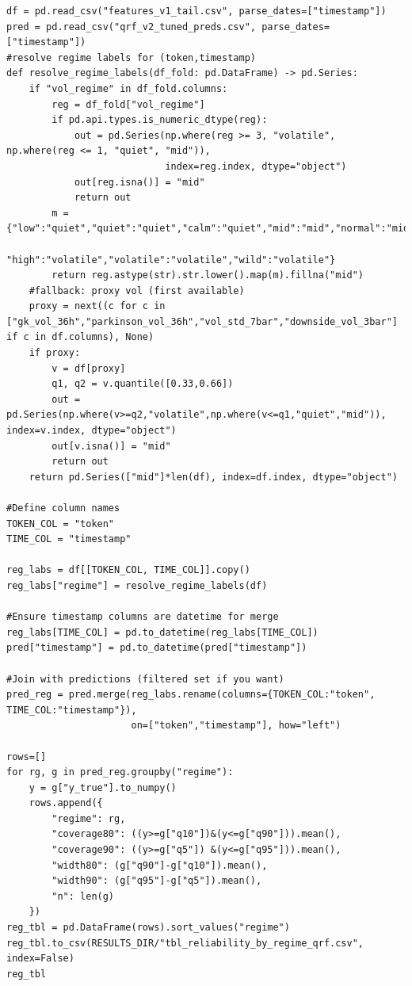 \documentclass[
  a4paper,
  DIV=11,
  numbers=noendperiod]{scrreprt}
\begin{document}
\begin{verbatim}
df = pd.read_csv("features_v1_tail.csv", parse_dates=["timestamp"])
pred = pd.read_csv("qrf_v2_tuned_preds.csv", parse_dates=["timestamp"])
#resolve regime labels for (token,timestamp) 
def resolve_regime_labels(df_fold: pd.DataFrame) -> pd.Series:
    if "vol_regime" in df_fold.columns:
        reg = df_fold["vol_regime"]
        if pd.api.types.is_numeric_dtype(reg):
            out = pd.Series(np.where(reg >= 3, "volatile", np.where(reg <= 1, "quiet", "mid")),
                            index=reg.index, dtype="object")
            out[reg.isna()] = "mid"
            return out
        m = {"low":"quiet","quiet":"quiet","calm":"quiet","mid":"mid","normal":"mid",
             "high":"volatile","volatile":"volatile","wild":"volatile"}
        return reg.astype(str).str.lower().map(m).fillna("mid")
    #fallback: proxy vol (first available)
    proxy = next((c for c in ["gk_vol_36h","parkinson_vol_36h","vol_std_7bar","downside_vol_3bar"] if c in df.columns), None)
    if proxy:
        v = df[proxy]
        q1, q2 = v.quantile([0.33,0.66])
        out = pd.Series(np.where(v>=q2,"volatile",np.where(v<=q1,"quiet","mid")), index=v.index, dtype="object")
        out[v.isna()] = "mid"
        return out
    return pd.Series(["mid"]*len(df), index=df.index, dtype="object")

#Define column names
TOKEN_COL = "token"
TIME_COL = "timestamp"

reg_labs = df[[TOKEN_COL, TIME_COL]].copy()
reg_labs["regime"] = resolve_regime_labels(df)

#Ensure timestamp columns are datetime for merge
reg_labs[TIME_COL] = pd.to_datetime(reg_labs[TIME_COL])
pred["timestamp"] = pd.to_datetime(pred["timestamp"])

#Join with predictions (filtered set if you want)
pred_reg = pred.merge(reg_labs.rename(columns={TOKEN_COL:"token", TIME_COL:"timestamp"}),
                      on=["token","timestamp"], how="left")

rows=[]
for rg, g in pred_reg.groupby("regime"):
    y = g["y_true"].to_numpy()
    rows.append({
        "regime": rg,
        "coverage80": ((y>=g["q10"])&(y<=g["q90"])).mean(),
        "coverage90": ((y>=g["q5"]) &(y<=g["q95"])).mean(),
        "width80": (g["q90"]-g["q10"]).mean(),
        "width90": (g["q95"]-g["q5"]).mean(),
        "n": len(g)
    })
reg_tbl = pd.DataFrame(rows).sort_values("regime")
reg_tbl.to_csv(RESULTS_DIR/"tbl_reliability_by_regime_qrf.csv", index=False)
reg_tbl
\end{verbatim}
\end{document}

